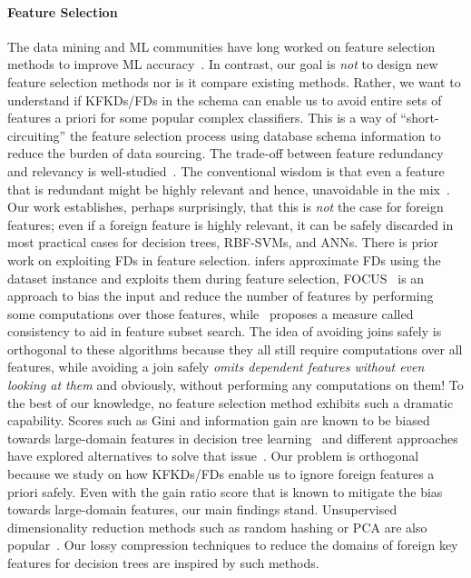 \documentclass{vldb}
\begin{document}
\paragraph*{Feature Selection}
The data mining and ML communities have long worked on feature selection methods to improve ML accuracy~\cite{guyonbook,hastie}.
In contrast, our goal is \textit{not} to design new feature selection methods nor is it compare existing methods. 
Rather, we want to understand if KFKDs/FDs in the schema can enable us to avoid entire sets of features a priori for some popular complex classifiers.
This is a way of ``short-circuiting'' the feature selection process using database schema information to reduce the burden of data sourcing.
The trade-off between feature redundancy and relevancy is well-studied~\cite{guyonbook,leiyu,daphnekoller}. The conventional wisdom is that even a feature that is 
redundant might be highly relevant and hence, unavoidable in the mix~\cite{guyonbook}. Our work establishes, perhaps surprisingly, that this is \textit{not} the case 
for foreign features; even if a foreign feature is highly relevant, it can be safely discarded in most practical cases for decision trees, RBF-SVMs, and ANNs.
There is prior work on exploiting FDs in feature selection.
\cite{approxfds} infers approximate FDs using the dataset instance and exploits them during feature selection, FOCUS~\cite{focus} is an 
approach to bias the input and reduce the number of features by performing some computations over those features, while~\cite{consistencyfs} proposes
a measure called consistency to aid in feature subset search.
The idea of avoiding joins safely is orthogonal to these algorithms because they all still require computations over all features, while avoiding a join safely 
\textit{omits dependent features without even looking at them} and obviously, without performing any computations on them!
To the best of our knowledge, no feature selection method exhibits such a dramatic capability.
Scores such as Gini and information gain are known to be biased towards large-domain features in decision tree learning~\cite{dtreebias1} and different approaches 
have explored alternatives to solve that issue~\cite{dtreebias2}. Our problem is orthogonal because we study on how KFKDs/FDs enable us to ignore foreign features 
a priori safely. Even with the gain ratio score that is known to mitigate the bias towards large-domain features, our main findings stand.
Unsupervised dimensionality reduction methods such as random hashing or PCA are also popular~\cite{hastie,mitchellbook}. Our lossy compression techniques to 
reduce the domains of foreign key features for decision trees are inspired by such methods.
\end{document}
